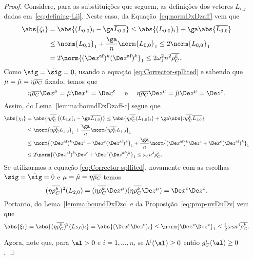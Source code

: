 \begin{proof}
Considere, para as substituições que seguem, as definições dos vetores $L_{i,j}$ dadas em~\eqref{eq:defining-Lij}. Neste caso, da Equação~\eqref{eq:normDxDzaff}  vem que  
\begin{align}
\abs{\zeta_i} & = \abs{(L_{0,0})_i - \ga \dbvec{L_{0,0}}} \leq \abs{(L_{0,0})_i} + \ga \abs{\dbvec{L_{0,0}}} \notag \\
			  & \leq	\norm{L_{0,0}}_1  + \dfrac{\ga}{n}\norm{L_{0,0}}_1   \leq 2\norm{L_{0,0}}_1 \notag \\
			  & = 2\norm{ \dekx  \dekz }_1   \leq 2\omega_1^{2} n^{2}\dbvec{\rho_C^k }. \label{eq:bound-zeta-i}
\end{align}
Como $\sig = \nextsig=0$, usando a equação \eqref{eq:Corrector-spllited} e sabendo que $\mu=\hat{\mu} = \eta\overline{\rho_{C}}$ fixado, temos que 
	\[
		\eta\dbvec{\rho_{C}}\Dex^\mu =  \nextmu\Dex^\mu = \Decox   \quad \text{ e } \quad \eta\dbvec{\rho_{C}}\Dez^\mu=  \nextmu\Dez^\mu=  \Decoz .
	\]
	Assim, do Lema~\ref{lemma:boundDxDzaff-c} segue que
\begin{align}
	\abs{\chi_i }  	& = \abs{\eta\dbvec{\rho_C^k } \left( ({L_{1,0}})_i - \ga\dbvec{L_{1,0}} \right)} \leq \abs{\eta\dbvec{\rho_C^k }  ({L_{1,0}})_i} + \ga\abs { \eta\dbvec{\rho_C^k }\dbvec{L_{1,0}}} 
					\notag \\
					&\leq \norm{\eta\dbvec{\rho_C^k }  L_{1,0}}_1 + \dfrac{\ga}{n}\norm{\eta\dbvec{\rho_C^k }  L_{1,0}}_1 \notag\\
					& \leq \norm{ \dekx \Decoz + \Decox \dekz }_1 + \dfrac{\ga}{n}\norm{ \dekx \Decoz + \Decox \dekz }_1 \notag\\
					& \leq 2 \norm{ \dekx \Decoz + \Decox \dekz }_1  \leq \omega_{3}n^{3}\dbvec{\rho_C^k }. \label{eq:bound-chi-i}
\end{align}
Se utilizarmos  a equação \eqref{eq:Corrector-spllited}, novamente com as escolhas $\sig = \nextsig=0$ e $\mu=\hat{\mu} = \eta\overline{\rho_{C}}$ temos
\[
	(\eta\dbvec{\rho_C^k })^2(L_{2,0}) = (\eta\dbvec{\rho_C^k }\Dex^\mu)(\eta\dbvec{\rho_C^k }\Dez^\mu) = \Decox\Decoz.
\]
Portanto, do Lema~\ref{lemma:boundDxDzc} e da Proposição~\ref{eq:prop-uvDuDv} vem que
\begin{equation}\label{eq:bound-xi-i}
	\abs{\xi_i}	 =  \abs{(\eta\dbvec{\rho_C^k })^2(L_{2,0})_i}  = \abs{(\Decox\Decoz)_i} \leq \norm{\Decox\Decoz}_1 \leq \tfrac{1}{2} \omega_2 n^{4}\dbvec{\rho_C^k }.
\end{equation}
	


Agora, note que, para $\al>0$ e $i=1,\ldots,n$, se $h^i(\al)\geq0$ então $g_C^i(\al)\geq 0$. 


\end{proof}
